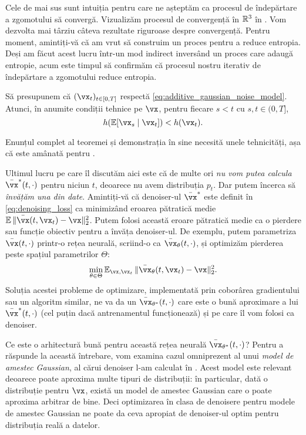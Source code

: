 \documentclass[../../book-main_ro.tex]{subfiles}
\begin{document}
Cele de mai sus sunt intuiția pentru care ne așteptăm ca procesul de îndepărtare a zgomotului să convergă. Vizualizăm procesul de convergență în \(\mathbb{R}^{3}\) în . Vom dezvolta mai târziu câteva rezultate riguroase despre convergență. Pentru moment, amintiți-vă că am vrut să construim un proces pentru a reduce entropia. Deși am făcut acest lucru într-un mod indirect inversând un proces care adaugă entropie, acum este timpul să confirmăm că procesul nostru iterativ de îndepărtare a zgomotului reduce entropia.

\begin{theorem}
	Să presupunem că \((\vx_{t})_{t \in [0, T]}\) respectă \eqref{eq:additive_gaussian_noise_model}. Atunci, în anumite condiții tehnice pe \(\vx\), pentru fiecare \(s < t\) cu \(s, t \in (0, T]\),
	\begin{equation}
		h(\Ex[\vx_{s} \mid \vx_{t}]) < h(\vx_{t}).
	\end{equation}
\end{theorem}
Enunțul complet al teoremei și demonstrația în sine necesită unele tehnicități, așa că este amânată pentru .

Ultimul lucru pe care îl discutăm aici este că de multe ori \textit{nu vom putea calcula} \(\bar{\vx}^{\ast}(t, \cdot)\) pentru niciun \(t\), deoarece nu avem distribuția \(p_{t}\). Dar putem încerca să \textit{învățăm una din date}. Amintiți-vă că denoiser-ul \(\bar{\vx}^{\ast}\) este definit în \eqref{eq:denoising_loss} ca minimizând eroarea pătratică medie \(\Ex\norm{\bar{\vx}(t, \vx_{t}) - \vx}_{2}^{2}\). Putem folosi această eroare pătratică medie ca o pierdere sau funcție obiectiv pentru a învăța denoiser-ul. De exemplu, putem parametriza \(\bar{\vx}(t, \cdot)\) printr-o rețea neurală, scriind-o ca \(\bar{\vx}_{\theta}(t, \cdot)\), și optimizăm pierderea peste spațiul parametrilor \(\Theta\):
\begin{equation}
	\min_{\theta \in \Theta}\Ex_{\vx, \vx_{t}}\norm{\bar{\vx}_{\theta}(t, \vx_{t}) - \vx}_{2}^{2}.
\end{equation}
Soluția acestei probleme de optimizare, implementată prin coborârea gradientului sau un algoritm similar, ne va da un \(\bar{\vx}_{\theta^{\ast}}(t, \cdot)\) care este o bună aproximare a lui \(\bar{\vx}^{\ast}(t, \cdot)\) (cel puțin dacă antrenamentul funcționează) și pe care îl vom folosi ca denoiser.

Ce este o arhitectură bună pentru această rețea neurală \(\bar{\vx}_{\theta^{\ast}}(t, \cdot)\)? Pentru a răspunde la această întrebare, vom examina cazul omniprezent al unui \textit{model de amestec Gaussian}, al cărui denoiser l-am calculat în . Acest model este relevant deoarece poate aproxima multe tipuri de distribuții: în particular, dată o distribuție pentru \(\vx\), există un model de amestec Gaussian care o poate aproxima arbitrar de bine. Deci optimizarea în clasa de denoisere pentru modele de amestec Gaussian ne poate da ceva apropiat de denoiser-ul optim pentru distribuția reală a datelor.
\end{document}
